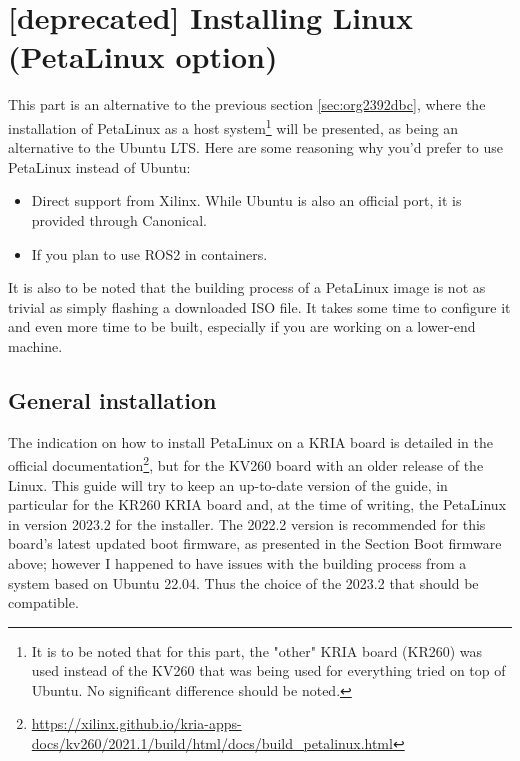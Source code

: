 \documentclass[10pt]{article}
\begin{document}
\section{[deprecated] Installing Linux (PetaLinux option)}
\label{sec:orga995fce}
This part is an alternative to the previous section \ref{sec:org2392dbc},
where the installation of PetaLinux as a host system\footnote{It is to be noted that for this part, the "other" KRIA board (KR260) was
used instead of the KV260 that was being used for everything tried on top of
Ubuntu. No significant difference should be noted.} will be presented,
as being an alternative to the Ubuntu LTS. Here are some reasoning why you'd
prefer to use PetaLinux instead of Ubuntu:
\begin{itemize}
\item Direct support from Xilinx. While Ubuntu is also an official port, it is
provided through Canonical.
\item If you plan to use ROS2 in containers.
\end{itemize}

It is also to be noted that the building process of a PetaLinux image is not as
trivial as simply flashing a downloaded ISO file. It takes some time to
configure it and even more time to be built, especially if you are working on a
lower-end machine.

\subsection{General installation}
\label{sec:orgff97119}
The indication on how to install PetaLinux on a KRIA board is detailed in the
official documentation\footnote{\url{https://xilinx.github.io/kria-apps-docs/kv260/2021.1/build/html/docs/build\_petalinux.html}}, but for the KV260 board with an older release of
the Linux. This guide will try to keep an up-to-date version of the guide, in
particular for the KR260 KRIA board and, at the time of writing, the PetaLinux
in version 2023.2 for the installer.  The 2022.2 version is recommended for this
board's latest updated boot firmware, as presented in the Section Boot firmware
above; however I happened to have issues with the building process from a system
based on Ubuntu 22.04. Thus the choice of the 2023.2 that should be compatible.
\end{document}
